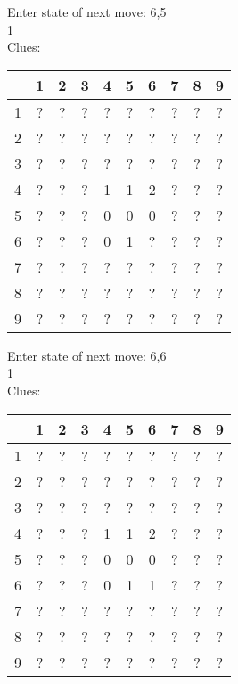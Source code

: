 Enter state of next move: 6,5\\
1\\
Clues:\\
\begin{tabular}{|c|c|c|c|c|c|c|c|c|c|}
\hline
  & 1 & 2 & 3 & 4 & 5 & 6 & 7 & 8 & 9\\
\hline
1 & ? & ? & ? & ? & ? & ? & ? & ? & ?\\
\hline
2 & ? & ? & ? & ? & ? & ? & ? & ? & ?\\
\hline
3 & ? & ? & ? & ? & ? & ? & ? & ? & ?\\
\hline
4 & ? & ? & ? & 1 & 1 & 2 & ? & ? & ?\\
\hline
5 & ? & ? & ? & 0 & 0 & 0 & ? & ? & ?\\
\hline
6 & ? & ? & ? & 0 & 1 & ? & ? & ? & ?\\
\hline
7 & ? & ? & ? & ? & ? & ? & ? & ? & ?\\
\hline
8 & ? & ? & ? & ? & ? & ? & ? & ? & ?\\
\hline
9 & ? & ? & ? & ? & ? & ? & ? & ? & ?\\
\hline
\end{tabular}

Enter state of next move: 6,6\\
1\\
Clues:\\
\begin{tabular}{|c|c|c|c|c|c|c|c|c|c|}
\hline
  & 1 & 2 & 3 & 4 & 5 & 6 & 7 & 8 & 9\\
\hline
1 & ? & ? & ? & ? & ? & ? & ? & ? & ?\\
\hline
2 & ? & ? & ? & ? & ? & ? & ? & ? & ?\\
\hline
3 & ? & ? & ? & ? & ? & ? & ? & ? & ?\\
\hline
4 & ? & ? & ? & 1 & 1 & 2 & ? & ? & ?\\
\hline
5 & ? & ? & ? & 0 & 0 & 0 & ? & ? & ?\\
\hline
6 & ? & ? & ? & 0 & 1 & 1 & ? & ? & ?\\
\hline
7 & ? & ? & ? & ? & ? & ? & ? & ? & ?\\
\hline
8 & ? & ? & ? & ? & ? & ? & ? & ? & ?\\
\hline
9 & ? & ? & ? & ? & ? & ? & ? & ? & ?\\
\hline
\end{tabular}

